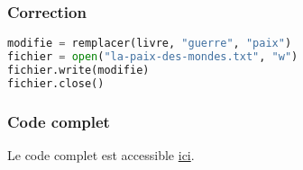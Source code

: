 \documentclass[svgnames,11pt]{beamer}
\begin{document}
\begin{frame}[fragile]
    \frametitle{Correction}

\begin{center}
\begin{lstlisting}[language=Python , basicstyle=\small, xleftmargin=2em, xrightmargin=2em]
modifie = remplacer(livre, "guerre", "paix")
fichier = open("la-paix-des-mondes.txt", "w")
fichier.write(modifie)
fichier.close()
\end{lstlisting}
\label{CODE}
\end{center}

\end{frame}
\begin{frame}
    \frametitle{Code complet}

    Le code complet est accessible \href{./scripts/chercher-remplacer.zip}{ici}.

\end{frame}
\end{document}
